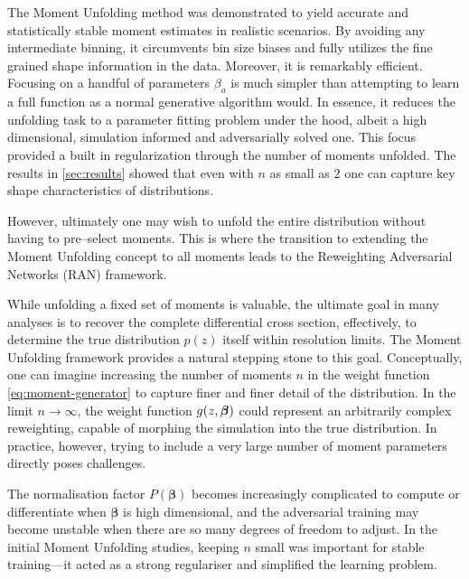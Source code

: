 {{        The Moment Unfolding method was demonstrated to yield accurate and statistically stable moment estimates in realistic scenarios.
        By avoiding any intermediate binning, it circumvents bin size biases and fully utilizes the fine grained shape information in the data.
        Moreover, it is remarkably efficient.
        Focusing on a handful of parameters $\beta_a$ is much simpler than attempting to learn a full function as a normal generative algorithm would.
        In essence, it reduces the unfolding task to a parameter fitting problem under the hood, albeit a high dimensional, simulation informed and adversarially solved one. This focus provided a built in regularization through the number of moments unfolded.
        The results in \cref{sec:results} showed that even with $n$ as small as \(2\) one can capture key shape characteristics of distributions.
        
        However, ultimately one may wish to unfold the entire distribution without having to pre--select moments.
        This is where the transition to extending the Moment Unfolding concept to all moments leads to the Reweighting Adversarial Networks (RAN) framework.

        While unfolding a fixed set of moments is valuable, the ultimate goal in many analyses is to recover the complete differential cross section, effectively, to determine the true distribution $p(z)$ itself within resolution limits.
        The Moment Unfolding framework provides a natural stepping stone to this goal. Conceptually, one can imagine increasing the number of moments $n$ in the weight function \cref{eq:moment-generator} to capture finer and finer detail of the distribution.
        In the limit $n \to \infty$, the weight function $g(z, \vb*\beta)$ could represent an arbitrarily complex reweighting, capable of morphing the simulation into the true distribution.
        In practice, however, trying to include a very large number of moment parameters directly poses challenges.
        
        The normalisation factor $P(\boldsymbol{\beta})$ becomes increasingly complicated to compute or differentiate when $\boldsymbol{\beta}$ is high dimensional, and the adversarial training may become unstable when there are so many degrees of freedom to adjust.
        In the initial Moment Unfolding studies, keeping $n$ small was important for stable training---it acted as a strong regulariser and simplified the learning problem.
        
}}
